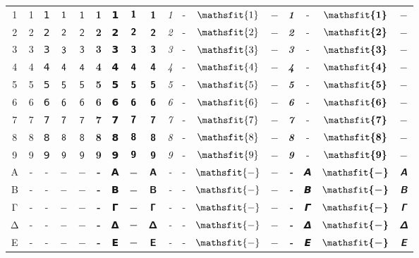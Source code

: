\documentclass{standalone}
\newcommand{\SANS}[1]{\ifmmode\mathsf{#1}\else\textsf{#1}\fi}
\newcommand{\BSANS}[1]{\ifmmode\boldsymbol{\mathsf{#1}}\else\textbf{\textsf{#1}}\fi}
\newcommand{\ISANS}[1]{\ifmmode\mathsfit{#1}\else\textit{\textsf{#1}}\fi}
\newcommand{\BISANS}[1]{\ifmmode\bm{\mathsfit{#1}}\else\textbf{\textsf{\textit{#1}}}\fi}
\begin{document}
\begin{tabular}{c|cc|cc|cc|cc|cc|cc|cc|cc}
1 & \SANS{1} & 𝟣 & $\SANS{1}$ & $𝟣$ & \BSANS{1} & 𝟭 & $\BSANS{1}$ & $𝟭$ & \ISANS{1} & - & $\ISANS{1}$ & $-$ & \BISANS{1} & - & $\BISANS{1}$ & $-$ \\
2 & \SANS{2} & 𝟤 & $\SANS{2}$ & $𝟤$ & \BSANS{2} & 𝟮 & $\BSANS{2}$ & $𝟮$ & \ISANS{2} & - & $\ISANS{2}$ & $-$ & \BISANS{2} & - & $\BISANS{2}$ & $-$ \\
3 & \SANS{3} & 𝟥 & $\SANS{3}$ & $𝟥$ & \BSANS{3} & 𝟯 & $\BSANS{3}$ & $𝟯$ & \ISANS{3} & - & $\ISANS{3}$ & $-$ & \BISANS{3} & - & $\BISANS{3}$ & $-$ \\
4 & \SANS{4} & 𝟦 & $\SANS{4}$ & $𝟦$ & \BSANS{4} & 𝟰 & $\BSANS{4}$ & $𝟰$ & \ISANS{4} & - & $\ISANS{4}$ & $-$ & \BISANS{4} & - & $\BISANS{4}$ & $-$ \\
5 & \SANS{5} & 𝟧 & $\SANS{5}$ & $𝟧$ & \BSANS{5} & 𝟱 & $\BSANS{5}$ & $𝟱$ & \ISANS{5} & - & $\ISANS{5}$ & $-$ & \BISANS{5} & - & $\BISANS{5}$ & $-$ \\
6 & \SANS{6} & 𝟨 & $\SANS{6}$ & $𝟨$ & \BSANS{6} & 𝟲 & $\BSANS{6}$ & $𝟲$ & \ISANS{6} & - & $\ISANS{6}$ & $-$ & \BISANS{6} & - & $\BISANS{6}$ & $-$ \\
7 & \SANS{7} & 𝟩 & $\SANS{7}$ & $𝟩$ & \BSANS{7} & 𝟳 & $\BSANS{7}$ & $𝟳$ & \ISANS{7} & - & $\ISANS{7}$ & $-$ & \BISANS{7} & - & $\BISANS{7}$ & $-$ \\
8 & \SANS{8} & 𝟪 & $\SANS{8}$ & $𝟪$ & \BSANS{8} & 𝟴 & $\BSANS{8}$ & $𝟴$ & \ISANS{8} & - & $\ISANS{8}$ & $-$ & \BISANS{8} & - & $\BISANS{8}$ & $-$ \\
9 & \SANS{9} & 𝟫 & $\SANS{9}$ & $𝟫$ & \BSANS{9} & 𝟵 & $\BSANS{9}$ & $𝟵$ & \ISANS{9} & - & $\ISANS{9}$ & $-$ & \BISANS{9} & - & $\BISANS{9}$ & $-$ \\
\midrule
Α & \SANS{-} & - & $\SANS{-}$ & $-$ & \BSANS{-} & 𝝖 & $\BSANS{-}$ & $𝝖$ & \ISANS{-} & - & $\ISANS{-}$ & $-$ & \BISANS{-} & 𝞐 & $\BISANS{-}$ & $𝞐$ \\
Β & \SANS{-} & - & $\SANS{-}$ & $-$ & \BSANS{-} & 𝝗 & $\BSANS{-}$ & $𝝗$ & \ISANS{-} & - & $\ISANS{-}$ & $-$ & \BISANS{-} & 𝞑 & $\BISANS{-}$ & $𝞑$ \\
Γ & \SANS{-} & - & $\SANS{-}$ & $-$ & \BSANS{-} & 𝝘 & $\BSANS{-}$ & $𝝘$ & \ISANS{-} & - & $\ISANS{-}$ & $-$ & \BISANS{-} & 𝞒 & $\BISANS{-}$ & $𝞒$ \\
Δ & \SANS{-} & - & $\SANS{-}$ & $-$ & \BSANS{-} & 𝝙 & $\BSANS{-}$ & $𝝙$ & \ISANS{-} & - & $\ISANS{-}$ & $-$ & \BISANS{-} & 𝞓 & $\BISANS{-}$ & $𝞓$ \\
Ε & \SANS{-} & - & $\SANS{-}$ & $-$ & \BSANS{-} & 𝝚 & $\BSANS{-}$ & $𝝚$ & \ISANS{-} & - & $\ISANS{-}$ & $-$ & \BISANS{-} & 𝞔 & $\BISANS{-}$ & $𝞔$ \\

\end{tabular}
\end{document}

